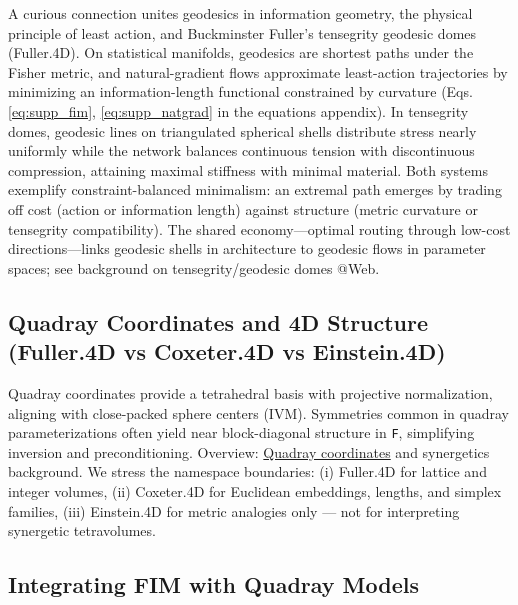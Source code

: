 \documentclass[
  10pt,
]{article}
\newcommand{\passthrough}[1]{#1}
\begin{document}
A curious connection unites geodesics in information geometry, the
physical principle of least action, and Buckminster Fuller's tensegrity
geodesic domes (Fuller.4D). On statistical manifolds, geodesics are
shortest paths under the Fisher metric, and natural-gradient flows
approximate least-action trajectories by minimizing an
information-length functional constrained by curvature (Eqs.
\eqref{eq:supp_fim}, \eqref{eq:supp_natgrad} in the equations appendix).
In tensegrity domes, geodesic lines on triangulated spherical shells
distribute stress nearly uniformly while the network balances continuous
tension with discontinuous compression, attaining maximal stiffness with
minimal material. Both systems exemplify constraint-balanced minimalism:
an extremal path emerges by trading off cost (action or information
length) against structure (metric curvature or tensegrity
compatibility). The shared economy---optimal routing through low-cost
directions---links geodesic shells in architecture to geodesic flows in
parameter spaces; see background on tensegrity/geodesic domes @Web.

\hypertarget{quadray-coordinates-and-4d-structure-fuller.4d-vs-coxeter.4d-vs-einstein.4d}{%
\subsection{Quadray Coordinates and 4D Structure (Fuller.4D vs
Coxeter.4D vs
Einstein.4D)}\label{quadray-coordinates-and-4d-structure-fuller.4d-vs-coxeter.4d-vs-einstein.4d}}

Quadray coordinates provide a tetrahedral basis with projective
normalization, aligning with close-packed sphere centers (IVM).
Symmetries common in quadray parameterizations often yield near
block-diagonal structure in \passthrough{\lstinline!F!}, simplifying
inversion and preconditioning. Overview:
\href{https://en.wikipedia.org/wiki/Quadray_coordinates}{Quadray
coordinates} and synergetics background. We stress the namespace
boundaries: (i) Fuller.4D for lattice and integer volumes, (ii)
Coxeter.4D for Euclidean embeddings, lengths, and simplex families,
(iii) Einstein.4D for metric analogies only --- not for interpreting
synergetic tetravolumes.

\hypertarget{integrating-fim-with-quadray-models}{%
\subsection{Integrating FIM with Quadray
Models}\label{integrating-fim-with-quadray-models}}
\end{document}
